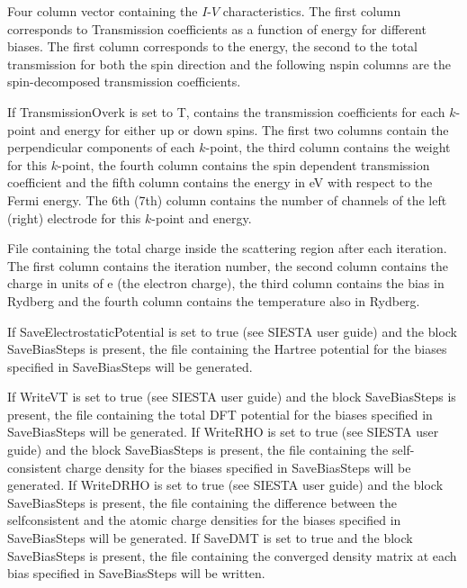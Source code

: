 \documentclass[11pt]{article}
\begin{document}
{
{Four column vector containing the $I$-$V$ characteristics. The first column corresponds to Transmission coefficients as a function of energy for different biases. The first column corresponds to the energy, the second to the total transmission for both the spin direction and the following nspin columns are the spin-decomposed transmission coefficients.}

{If TransmissionOverk is set to T,  contains the transmission coefficients for each $k$-point and energy for either up or down spins. The first two columns contain the perpendicular components of each $k$-point, the third column contains the weight for this $k$-point, the fourth column contains the spin dependent transmission coefficient and the fifth column contains the energy in eV with respect to the Fermi energy. The 6th (7th) column contains the number of channels of the left (right) electrode for this $k$-point and energy.}

{File containing the total charge inside the scattering region after each iteration. The first column contains the iteration number, the second column contains the charge in units of e (the electron charge), the third column contains the bias in Rydberg and the fourth column contains the temperature also in Rydberg.}

{If SaveElectrostaticPotential is set to true (see SIESTA user guide) and the block SaveBiasSteps is present, the file  containing the Hartree potential for the biases specified in SaveBiasSteps will be generated.}

{If WriteVT is set to true (see SIESTA user guide) and the block SaveBiasSteps is present, the file  containing the total DFT potential for the biases specified in SaveBiasSteps will be generated.}
{If WriteRHO is set to true (see SIESTA user guide) and the block SaveBiasSteps is present, the file  containing the self-consistent charge density for the biases specified in SaveBiasSteps will be generated.}
{If WriteDRHO is set to true (see SIESTA user guide) and the block SaveBiasSteps is present, the file  containing the difference between the selfconsistent and the atomic charge densities for the biases specified in SaveBiasSteps will be generated.}
{If SaveDMT is set to true and the block SaveBiasSteps is present, the file  containing the converged density matrix at each bias specified in SaveBiasSteps will be written.}

}
\end{document}
